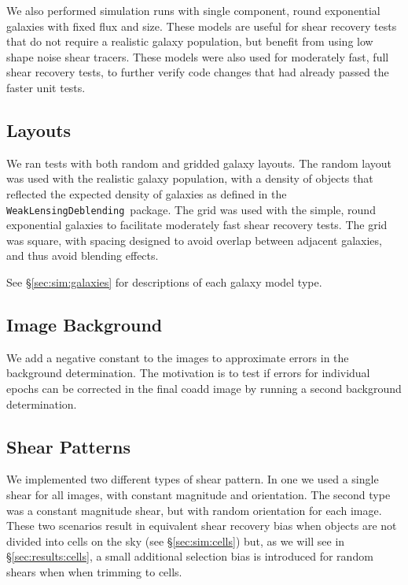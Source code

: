 \documentclass[twocolumn,twocolappendix,astrosym]{openjournal}
\newcommand{\descwl}{\texttt{WeakLensingDeblending}}
\begin{document}
We also performed simulation runs with single component, round exponential
galaxies with fixed flux and size.  These models are useful for shear recovery
tests that do not require a realistic galaxy population, but benefit from using
low shape noise shear tracers.  These models were also used for moderately
fast, full shear recovery tests, to further verify code changes that had
already passed the faster unit tests.

\subsection{Layouts} \label{sec:sim:layouts}

We ran tests with both random and gridded galaxy layouts.  The random layout
was used with the realistic galaxy population, with a density of objects that
reflected the expected density of galaxies as defined in the \descwl\ package.
The grid was used with the simple, round exponential galaxies to facilitate
moderately fast shear recovery tests.  The grid was square, with spacing
designed to avoid overlap between adjacent galaxies, and thus avoid blending
effects.

See \S \ref{sec:sim:galaxies} for descriptions of each galaxy model type.

\subsection{Image Background} \label{sec:sim:bgerr}

We add a negative constant to the images to approximate errors in the
background determination.  The motivation is to test if errors for individual
epochs can be corrected in the final coadd image by running a second background
determination.

\subsection{Shear Patterns} \label{sec:sim:shears}

We implemented two different types of shear pattern.  In one we used a single
shear for all images, with constant magnitude and orientation.  The second type
was a constant magnitude shear, but with random orientation for each image.
These two scenarios result in equivalent shear recovery bias when objects are
not divided into cells on the sky (see \S \ref{sec:sim:cells}) but, as we will
see in \S \ref{sec:results:cells}, a small additional selection bias is
introduced for random shears when when trimming to cells.
\end{document}
